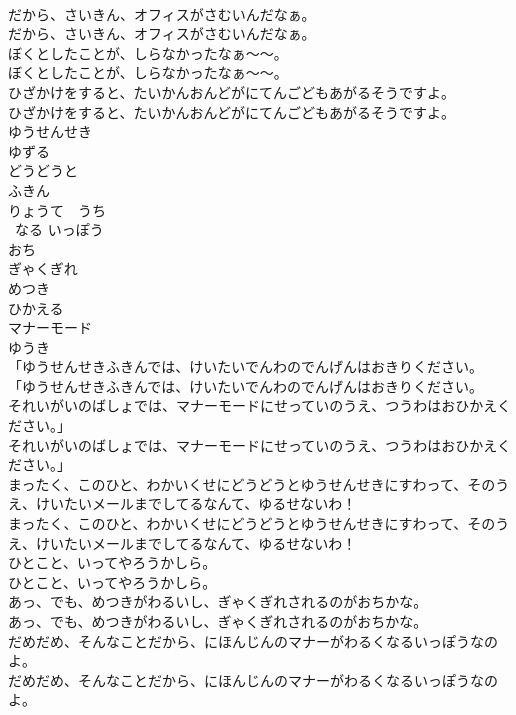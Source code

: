 \documentclass[8pt]{extreport}
\begin{document}
\begin{CJK}{UTF8}{min}
\\	だから、さいきん、オフィスがさむいんだなぁ。	
\\	だから、さいきん、オフィスがさむいんだなぁ。 
\\	ぼくとしたことが、しらなかったなぁ～～。	
\\	ぼくとしたことが、しらなかったなぁ～～。 
\\	ひざかけをすると、たいかんおんどがにてんごどもあがるそうですよ。	
\\	ひざかけをすると、たいかんおんどがにてんごどもあがるそうですよ。 
\\	ゆうせんせき
\\	ゆずる
\\	どうどうと
\\	ふきん
\\	りょうて　うち
\\	~なる いっぽう
\\	おち
\\	ぎゃくぎれ
\\	めつき
\\	ひかえる
\\	マナーモード
\\	ゆうき
\\	「ゆうせんせきふきんでは、けいたいでんわのでんげんはおきりください。	
\\	「ゆうせんせきふきんでは、けいたいでんわのでんげんはおきりください。 
\\	それいがいのばしょでは、マナーモードにせっていのうえ、つうわはおひかえください。」	
\\	それいがいのばしょでは、マナーモードにせっていのうえ、つうわはおひかえください。」 
\\	まったく、このひと、わかいくせにどうどうとゆうせんせきにすわって、そのうえ、けいたいメールまでしてるなんて、ゆるせないわ！	
\\	まったく、このひと、わかいくせにどうどうとゆうせんせきにすわって、そのうえ、けいたいメールまでしてるなんて、ゆるせないわ！ 
\\	ひとこと、いってやろうかしら。	
\\	ひとこと、いってやろうかしら。 
\\	あっ、でも、めつきがわるいし、ぎゃくぎれされるのがおちかな。	
\\	あっ、でも、めつきがわるいし、ぎゃくぎれされるのがおちかな。 
\\	だめだめ、そんなことだから、にほんじんのマナーがわるくなるいっぽうなのよ。	
\\	だめだめ、そんなことだから、にほんじんのマナーがわるくなるいっぽうなのよ。 

\end{CJK}
\end{document}
